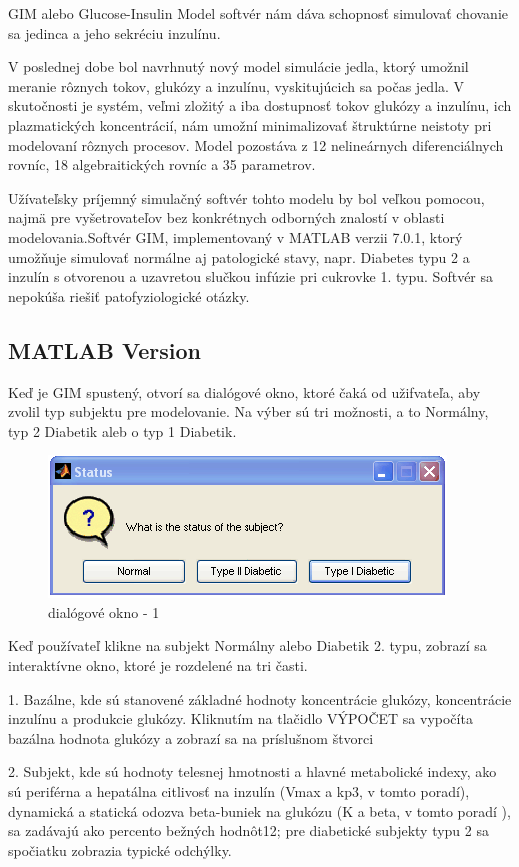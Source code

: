 
GIM alebo Glucose-Insulin Model softvér nám dáva schopnosť simulovať chovanie sa jedinca a jeho sekréciu inzulínu.\cite{2007}

V poslednej dobe bol navrhnutý nový model simulácie jedla, ktorý umožnil meranie rôznych tokov, glukózy a inzulínu, vyskitujúcich sa počas jedla. V skutočnosti je systém, veľmi zložitý a iba dostupnosť tokov glukózy a inzulínu, ich plazmatických koncentrácií, nám umožní minimalizovať štruktúrne neistoty pri modelovaní rôznych procesov. Model pozostáva z 12 nelineárnych diferenciálnych rovníc, 18 algebraitických rovníc a 35 parametrov.\cite{2007}

 Užívateľsky príjemný simulačný softvér tohto modelu by bol veľkou pomocou, najmä pre vyšetrovateľov bez konkrétnych odborných znalostí v oblasti modelovania.Softvér GIM, implementovaný v MATLAB verzii 7.0.1, ktorý umožňuje simulovať normálne aj patologické stavy, napr. Diabetes typu 2 a inzulín s otvorenou a uzavretou slučkou infúzie pri cukrovke 1. typu. Softvér sa nepokúša riešiť patofyziologické otázky.

\subsection{MATLAB Version}

Keď je GIM spustený, otvorí sa dialógové okno, ktoré čaká od užifvateľa, aby zvolil typ subjektu pre modelovanie. Na výber sú tri možnosti, a to Normálny, typ 2 Diabetik aleb o typ 1 Diabetik.
\begin{figure}[h]
\includegraphics[scale=1]{ob-1.PNG}
\caption{dialógové okno - 1 \cite{2007}}
\end{figure}
Keď používateľ klikne na subjekt Normálny alebo Diabetik 2. typu, zobrazí sa interaktívne okno, ktoré je rozdelené na tri časti. 

1. Bazálne, kde sú stanovené základné hodnoty koncentrácie glukózy, koncentrácie inzulínu a produkcie glukózy. Kliknutím na tlačidlo VÝPOČET sa vypočíta bazálna hodnota glukózy a zobrazí sa na príslušnom štvorci 

2. Subjekt, kde sú hodnoty telesnej hmotnosti a hlavné metabolické indexy, ako sú periférna a hepatálna citlivosť na inzulín (Vmax a kp3, v tomto poradí), dynamická a statická odozva beta-buniek na glukózu (K a beta, v tomto poradí ), sa zadávajú ako percento bežných hodnôt12; pre diabetické subjekty typu 2 sa spočiatku zobrazia typické odchýlky. 

